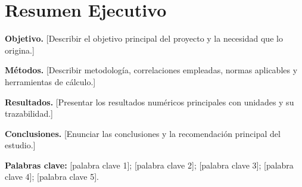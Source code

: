 \newpage
\section*{Resumen Ejecutivo}

\textbf{Objetivo.}
[Describir el objetivo principal del proyecto y la necesidad que lo origina.]

\textbf{Métodos.}
[Describir metodología, correlaciones empleadas, normas aplicables y herramientas de cálculo.]

\textbf{Resultados.}
[Presentar los resultados numéricos principales con unidades y su trazabilidad.]

\textbf{Conclusiones.}
[Enunciar las conclusiones y la recomendación principal del estudio.]

\vspace{1em}
\noindent\textbf{Palabras clave:}
[palabra clave 1]; [palabra clave 2]; [palabra clave 3]; [palabra clave 4]; [palabra clave 5].

\newpage
